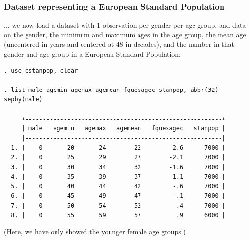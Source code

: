 \documentclass[11pt]{beamer}
\begin{document}
\begin{frame}[fragile]
\frametitle{Dataset representing a European Standard Population}

$\ldots$ we now load a dataset with 1 observation per gender per age group,
and data on the gender, the minimum and maximum ages in the age group,
the mean age (uncentered in years and centered at 48 in decades),
and the number in that gender and age group in a European Standard Population:

\tiny
\begin{verbatim}
. use estanpop, clear

. list male agemin agemax agemean fquesagec stanpop, abbr(32) sepby(male)

     +--------------------------------------------------------+
     | male   agemin   agemax   agemean   fquesagec   stanpop |
     |--------------------------------------------------------|
  1. |    0       20       24        22        -2.6      7000 |
  2. |    0       25       29        27        -2.1      7000 |
  3. |    0       30       34        32        -1.6      7000 |
  4. |    0       35       39        37        -1.1      7000 |
  5. |    0       40       44        42         -.6      7000 |
  6. |    0       45       49        47         -.1      7000 |
  7. |    0       50       54        52          .4      7000 |
  8. |    0       55       59        57          .9      6000 |
\end{verbatim}
\normalsize

(Here, we have only showed the younger female age groups.)

\end{frame}
\end{document}
